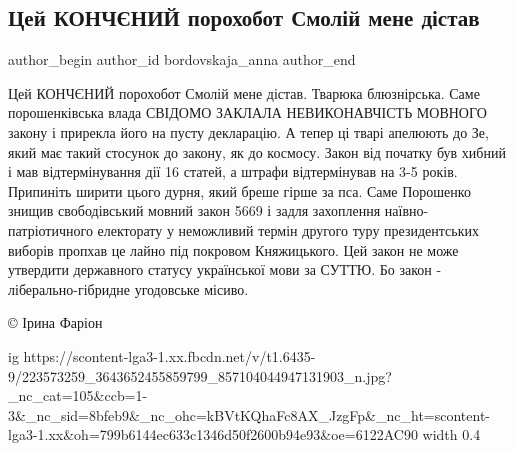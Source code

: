  
 
 
 
 
 
\subsection{Цей КОНЧЄНИЙ порохобот Смолій мене дістав}
\label{sec:25_07_2021.fb.bordovskaja_anna.1.smolij_porohobot}
 
\ifcmt
 author_begin
   author_id bordovskaja_anna
 author_end
\fi

Цей КОНЧЄНИЙ порохобот Смолій мене дістав. Тварюка блюзнірська. Саме
порошенківська влада СВІДОМО ЗАКЛАЛА НЕВИКОНАВЧІСТЬ МОВНОГО закону і прирекла
його на пусту декларацію. А тепер ці тварі апелюють до Зе, який має такий
стосунок до закону, як  до космосу. Закон від початку був хибний і мав
відтермінування дії 16 статей, а штрафи відтермінував на 3-5 років. Припиніть
ширити цього дурня, який бреше гірше за пса. Саме Порошенко знищив
свободівський мовний закон 5669 і задля захоплення наївно-патріотичного
електорату у неможливий термін другого туру президентських виборів пропхав це
лайно під покровом Княжицького. Цей закон не може утвердити державного статусу
української мови за СУТТЮ. Бо закон - ліберально-гібридне угодовське місиво.

© Ірина Фаріон

\ifcmt
  ig https://scontent-lga3-1.xx.fbcdn.net/v/t1.6435-9/223573259_3643652455859799_857104044947131903_n.jpg?_nc_cat=105&ccb=1-3&_nc_sid=8bfeb9&_nc_ohc=kBVtKQhaFc8AX_JzgFp&_nc_ht=scontent-lga3-1.xx&oh=799b6144ec633c1346d50f2600b94e93&oe=6122AC90
  width 0.4
\fi

